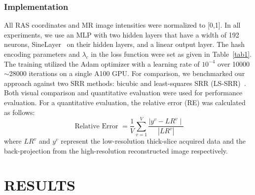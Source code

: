\documentclass[AMA,STIX2COL]{MRM}
\begin{document}
\subsubsection{Implementation}
All RAS coordinates and MR image intensities were normalized to [0,1]. 
%
In all experiments, we use an MLP with two hidden layers that have a width
of 192 neurons, SineLayer~\cite{sitzmann2020implicit} on their hidden layers, and a linear output layer. The hash encoding parameters and $\lambda_c$ in the loss function were set as given in Table~\ref{tab1}.
%
The training utilized the Adam optimizer with a learning rate of $10^{-4}$ over 10000$\sim$28000 iterations on a single A100 GPU. For comparison, we benchmarked our approach against two SRR methods: bicubic and least-squares SRR (LS-SRR)~\cite{vis2021accuracy}. 
% 
Both visual comparison and quantitative evaluation were used for performance evaluation. For a quantitative evaluation, the relative error (RE) was calculated as follows:
\begin{equation}
\text { Relative Error }=\frac{1}{V} \sum_{v=1}^V\frac{\mid { y^{v} }- { LR }^{v} \mid}{ { |LR^{v}|}}
\end{equation}
where $LR^v$ and $y^v$ represent the low-resolution thick-slice acquired data and the back-projection from the high-resolution reconstructed image respectively.


\section{RESULTS}
\label{sec:RESULTS}
\end{document}
